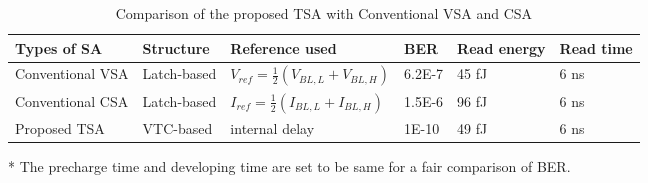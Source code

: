 \begin{table}[ht!]%
\centering
\caption{Comparison of the proposed TSA with Conventional VSA and CSA}
\label{tab_performance_comp}
\begin{threeparttable}
\begingroup
\setlength{\tabcolsep}{3pt} %
\renewcommand{\arraystretch}{1.5} %
\begin{tabular}{@{}m{3cm}<{\centering}m{2cm}<{\centering}m{4cm}<{\centering}m{2cm}<{\centering}m{2cm}<{\centering}m{2cm}<{\centering}@{}}
\toprule[1.5pt]
Types of SA & Structure & Reference used & BER & Read energy & Read time\tnote{*}  \\ \hline
\midrule
Conventional VSA & Latch-based & $V_{ref}=\frac{1}{2}(V_{BL,L}+V_{BL,H})$ & 6.2E-7 & 45 fJ & 6 ns\\\hline
Conventional CSA & Latch-based & $I_{ref}=\frac{1}{2}(I_{BL,L}+I_{BL,H})$ & 1.5E-6 & 96 fJ & 6 ns\\\hline
Proposed TSA & VTC-based & internal delay & 1E-10 & 49 fJ & 6 ns\\
\bottomrule[1.5pt]
\end{tabular}
\begin{tablenotes}
\item[*] The precharge time and developing time are set to be same for a fair comparison of BER.
\end{tablenotes}
\endgroup
\end{threeparttable}
\end{table} 



